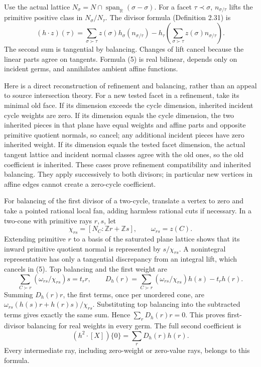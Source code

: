 \documentclass[
  11pt,
]{article}
\begin{document}
Use the actual lattice
\(N_\sigma=N\cap\operatorname{span}_{\mathbb{R}}(\sigma-\sigma)\). For a
facet \(\tau\prec\sigma\), \(n_{\sigma/\tau}\) lifts the primitive
positive class in \(N_\sigma/N_\tau\). The divisor formula (Definition
2.31) is \[
 (h\cdot z)(\tau)=\sum_{\sigma\succ\tau}z(\sigma)h_\sigma(n_{\sigma/\tau})
       -h_\tau\left(\sum_{\sigma\succ\tau}z(\sigma)n_{\sigma/\tau}\right).
                                                               \tag{5}
\] The second sum is tangential by balancing. Changes of lift cancel
because the linear parts agree on tangents. Formula (5) is real
bilinear, depends only on incident germs, and annihilates ambient affine
functions.

Here is a direct reconstruction of refinement and balancing, rather than
an appeal to source intersection theory. For a new tested facet in a
refinement, take its minimal old face. If its dimension exceeds the
cycle dimension, inherited incident cycle weights are zero. If its
dimension equals the cycle dimension, the two inherited pieces in that
plane have equal weights and affine parts and opposite primitive
quotient normals, so cancel; any additional incident pieces have zero
inherited weight. If its dimension equals the tested facet
dimension, the actual tangent lattice and incident normal classes agree
with the old ones, so the old coefficient is inherited. These cases
prove refinement compatibility and inherited balancing. They apply
successively to both divisors; in particular new vertices in affine
edges cannot create a zero-cycle coefficient.

For balancing of the first divisor of a two-cycle, translate a vertex to
zero and take a pointed rational local fan, adding harmless rational
cuts if necessary. In a two-cone with primitive rays \(r,s\), let \[
 \chi_{rs}=[N_C:\mathbb{Z}r+\mathbb{Z}s],\qquad \omega_{rs}=z(C).
\] Extending primitive \(r\) to a basis of the saturated plane lattice
shows that its inward primitive quotient normal is represented by
\(s/\chi_{rs}\). A nonintegral representative has only a tangential
discrepancy from an integral lift, which cancels in (5). Top balancing
and the first weight are \[
 \sum_{C\succ r}(\omega_{rs}/\chi_{rs})s=t_r r,
 \qquad D_h(r)=\sum_{C\succ r}(\omega_{rs}/\chi_{rs})h(s)-t_rh(r). \tag{6}
\] Summing \(D_h(r)r\), the first terms, once per unordered cone, are
\(\omega_{rs}(h(s)r+h(r)s)/\chi_{rs}\). Substituting top balancing into
the subtracted terms gives exactly the same sum. Hence
\(\sum_rD_h(r)r=0\). This proves first-divisor balancing for real
weights in every germ. The full second coefficient is \[
                       (h^2\cdot[X])\{0\}=\sum_rD_h(r)h(r).     \tag{7}
\] Every intermediate ray, including zero-weight or zero-value rays,
belongs to this formula.
\end{document}
